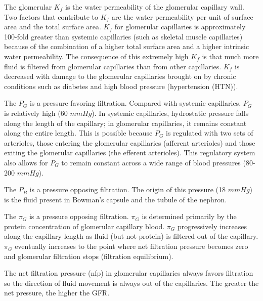 The glomerular $K_f$  is the water permeability of the glomerular capillary wall. Two factors that contribute to $K_f$ are the water permeability per unit of surface area and the total surface area. $K_f$ for glomerular capillaries is approximately 100-fold greater than systemic capillaries (such as skeletal muscle capillaries) because of the combination of a higher total surface area and a higher intrinsic water permeability. The consequence of this extremely high $K_f$ is that much more fluid is filtered from glomerular capillaries than from other capillaries. $K_f$ is decreased with damage to the glomerular capillaries brought on by chronic conditions such as diabetes and high blood pressure (hypertension (HTN)).

The $P_{G}$ is a pressure favoring filtration.  Compared with systemic capillaries, $P_{G}$ is relatively high (60 $mm Hg$). In systemic capillaries, hydrostatic pressure falls along the length of the capillary; in glomerular capillaries, it remains constant along the entire length. This is possible because $P_{G}$ is regulated with two sets of arterioles, those entering the glomerular capillaries (afferent arterioles) and those exiting the glomerular capillaries (the efferent arterioles). This regulatory system also allows for $P_{G}$  to remain constant across a wide range of blood pressures (80-200 $mm Hg$).

The $P_{B}$ is a pressure opposing filtration. The origin of this pressure (18 $mm Hg$) is the fluid present in Bowman’s capsule and the tubule of the nephron.

The $\pi_{G}$ is a pressure opposing filtration. $\pi_{G}$ is determined primarily by the protein concentration of glomerular capillary blood. $\pi_{G}$ progressively increases along the capillary length as fluid (but not protein) is filtered out of the capillary. $\pi_{G}$ eventually increases to the point where net filtration pressure becomes zero and glomerular filtration stops (filtration equilibrium). 

The net filtration pressure (nfp) in glomerular capillaries always favors filtration so the direction of fluid movement is always out of the capillaries. The greater the net pressure, the higher the GFR.


